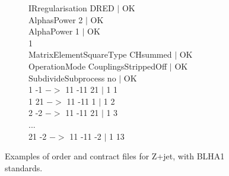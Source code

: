 \begin{figure}[htb!]
\begin{subfigure}[]{0.49\textwidth}
{{IRregularisation DRED $|$ OK\\
AlphasPower 2 $|$ OK\\
AlphaPower  1   $|$ OK\\           1\\
MatrixElementSquareType CHsummed $|$ OK\\
OperationMode CouplingsStrippedOff $|$ OK\\
SubdivideSubprocess  no $|$ OK\\
1 -1 $->$ 11 -11 21 $|$ 1 1\\
1 21 $->$ 11 -11 1  $|$ 1 2\\
2 -2 $->$ 11 -11 21 $|$ 1 3\\
...\\
21 -2 $->$ 11 -11 -2 $|$ 1 13\\}
}
\end{subfigure}
\caption{Examples of order and contract files for Z+jet, with BLHA1 standards.}
\label{fig:BLHA1}
\end{figure}  



